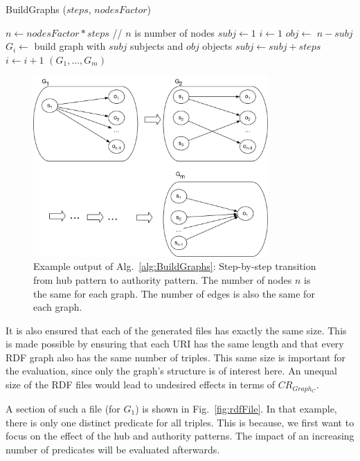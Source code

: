 \begin{algorithm}
	\caption{BuildGraphs ($steps$, $ nodesFactor$)}\label{alg:BuildGraphs}
	\begin{algorithmic}[1]
	\State $n \leftarrow nodesFactor*steps$ // $n$ is number of nodes
	\State $subj \leftarrow 1$
	\State $i \leftarrow 1$
		\State $obj \leftarrow$ $n-subj$ 
		\State $G_i \leftarrow$ build graph with $subj$ subjects and $obj$ objects\label{line:buildgraph}
		\State  $subj\leftarrow subj+steps$
		\State  $i\leftarrow i+1$
	\EndWhile
	\State \Return $(G_1,...,G_m)$
	\end{algorithmic}
\end{algorithm}

\begin{figure}[h]
	\centering
	\includegraphics[width=0.8\textwidth]{figures/GRPvsHDT/starpattern.pdf}
	\caption{Example output of Alg.~\ref{alg:BuildGraphs}: Step-by-step transition from hub pattern to authority pattern. The number of nodes $n$ is the same for each graph. The number of edges is also the same for each graph.}
	\label{fig:star_pattern}
\end{figure}

It is also ensured that each of the generated files has exactly the same size. This is made possible by ensuring that each URI has the same length and that every RDF graph also has the same number of triples. This same size is important for the evaluation, since only the graph's structure is of interest here. An unequal size of the RDF files would lead to undesired effects in terms of $CR_{Graph_C}$.

A section of such a file (for $G_1$) is shown in Fig.~\ref{fig:rdfFile}. In that example, there is only one distinct predicate for all triples. This is because, we first want to focus on the effect of the hub and authority patterns. The impact of an increasing number of predicates will be evaluated afterwards.


